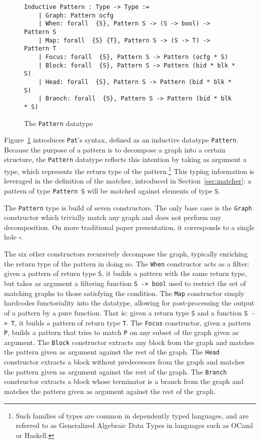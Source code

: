 \documentclass[11pt]{article}
\newcommand{\inlinecoq}[1]{\mbox{\lstinline[style=customcoq,columns=fixed,basewidth=.48em]{#1}}}
\newcommand{\ilc}[1]{\inlinecoq{#1}}
\newcommand{\pat}{\texttt{Pat}\xspace}
\begin{document}
\begin{figure}
  \begin{lstlisting}[style=customcoq,basicstyle=\small\ttfamily]
    Inductive Pattern : Type -> Type :=
    | Graph: Pattern ocfg
    | When: forall  {S}, Pattern S -> (S -> bool) -> Pattern S
    | Map: forall  {S} {T}, Pattern S -> (S -> T) -> Pattern T
    | Focus: forall  {S}, Pattern S -> Pattern (ocfg * S)
    | Block: forall  {S}, Pattern S -> Pattern (bid * blk * S)
    | Head: forall  {S}, Pattern S -> Pattern (bid * blk * S)
    | Branch: forall  {S}, Pattern S -> Pattern (bid * blk * S)
  \end{lstlisting}
  \caption{The \ilc{Pattern} datatype}
  \label{fig:pat}
\end{figure}

Figure~\ref{fig:pat} introduces \pat{}'s syntax, defined as an inductive datatype \ilc{Pattern}.
Because the purpose of a pattern is to decompose a graph into a certain structure, the \ilc{Pattern} datatype reflects this intention by taking as argument a type, which represents the return type of the pattern.\footnote{Such families of types are common in dependently typed languages, and are referred to as Generalized Algebraic Data Types in languages such as OCaml or Haskell.}
This typing information is leveraged in the definition of the matcher, introduced in Section~\ref{sec:matcher}: a pattern of type \ilc{Pattern S} will be matched against elements of type \ilc{S}.

The \ilc{Pattern} type is build of seven constructors. The only base case is the \ilc{Graph} constructor which trivially match any graph and does not perform any decomposition. On more traditional paper presentation, it corresponds to a single hole $\square$.

The six other constructors recursively decompose the graph, typically enriching the return type of the pattern in doing so. 
The \ilc{When} constructor acts as a filter:
given a pattern of return type \ilc{S}, it builds a pattern with the same return type, but takes as argument a filtering function \ilc{S -> bool} used to restrict the set of matching graphs to those satisfying the condition.
The \ilc{Map} constructor simply hardcodes functoriality into the datatype, allowing for post-processing the output of a pattern by a pure function. That is: given a return type \ilc{S} and a function \ilc{S -> T}, it builds a pattern of return type \ilc{T}.
The \ilc{Focus} constructor, given a pattern \ilc{P}, builds a pattern that tries to match \ilc{P} on any subset of the graph given as argument.
The \ilc{Block} constructor extracts any block from the graph and matches the pattern given as argument against the rest of the graph.
The \ilc{Head} constructor extracts a block without predecessors from the graph and matches the pattern given as argument against the rest of the graph.
The \ilc{Branch} constructor extracts a block whose terminator is a branch from the graph and matches the pattern given as argument against the rest of the graph.
\end{document}
